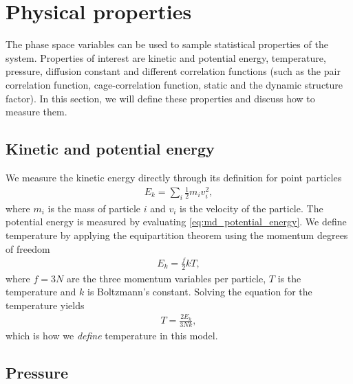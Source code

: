 \section{Physical properties}
The phase space variables can be used to sample statistical properties of the system. Properties of interest are kinetic and potential energy, temperature, pressure, diffusion constant and different correlation functions (such as the pair correlation function, cage-correlation function, static and the dynamic structure factor). In this section, we will define these properties and discuss how to measure them.
\subsection{Kinetic and potential energy}
We measure the kinetic energy directly through its definition for point particles
\begin{align}
	E_k = \sum_i \frac{1}{2} m_iv_i^2,
\end{align}
where $m_i$ is the mass of particle $i$ and $v_i$ is the velocity of the particle. The potential energy is measured by evaluating \eqref{eq:md_potential_energy}. We define temperature by applying the equipartition theorem using the momentum degrees of freedom
\begin{align*}
	E_k = \frac{f}{2}kT,
\end{align*}
where $f=3N$ are the three momentum variables per particle, $T$ is the temperature and $k$ is Boltzmann's constant. Solving the equation for the temperature yields
\begin{align}
	T = \frac{2E_k}{3Nk},
\end{align}
which is how we \textit{define} temperature in this model. 
\subsection{Pressure}

